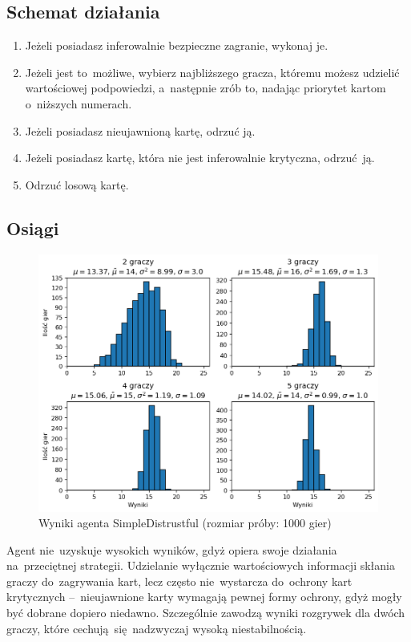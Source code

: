 \documentclass[declaration,shortabstract,inz]{iithesis}
\begin{document}
\subsection*{Schemat działania}

\begin{enumerate}
	\item Jeżeli posiadasz inferowalnie bezpieczne zagranie, wykonaj je.
	\item Jeżeli jest to~możliwe, wybierz najbliższego gracza, któremu możesz udzielić wartościowej podpowiedzi, a~następnie zrób to, nadając priorytet kartom o~niższych numerach.
	\item Jeżeli posiadasz nieujawnioną kartę, odrzuć ją.
	\item Jeżeli posiadasz kartę, która nie jest inferowalnie krytyczna, odrzuć ją.
	\item Odrzuć losową kartę.
\end{enumerate}

\subsection*{Osiągi}

\begin{figure}[H]
	\centering
	\captionsetup{format=hang}
	\includegraphics[width=\textwidth,height=\textheight,keepaspectratio]{SimpleDistrustful.png}
	\caption[Caption]{Wyniki agenta SimpleDistrustful (rozmiar próby: 1000 gier)}
	\label{fig:SimpleDistrustful}
\end{figure}

Agent nie~uzyskuje wysokich wyników, gdyż opiera swoje działania na~przeciętnej strategii. Udzielanie wyłącznie wartościowych informacji skłania graczy do~zagrywania kart, lecz często nie~wystarcza do~ochrony kart krytycznych --~nieujawnione karty wymagają pewnej formy ochrony, gdyż mogły być dobrane dopiero niedawno. Szczególnie zawodzą wyniki rozgrywek dla dwóch graczy, które cechują~się nadzwyczaj wysoką niestabilnością.
\end{document}
